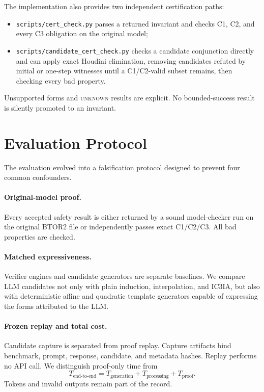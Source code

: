 \documentclass[10pt]{article}
\newcommand{\icthreeia}{\textsc{IC3IA}}
\newcommand{\btor}{\textsc{BTOR2}}
\newcommand{\code}[1]{\texttt{#1}}
\newcommand{\unknown}{\textsc{unknown}}
\begin{document}
The implementation also provides two independent certification paths:
\begin{itemize}
  \item \code{scripts/cert\_check.py} parses a returned invariant and checks
        C1, C2, and every C3 obligation on the original model;
  \item \code{scripts/candidate\_cert\_check.py} checks a candidate conjunction
        directly and can apply exact Houdini elimination, removing candidates
        refuted by initial or one-step witnesses until a C1/C2-valid subset
        remains, then checking every bad property.
\end{itemize}
Unsupported forms and \unknown{} results are explicit.  No bounded-success
result is silently promoted to an invariant.

\section{Evaluation Protocol}
\label{sec:protocol}

The evaluation evolved into a falsification protocol designed to prevent four
common confounders.

\paragraph{Original-model proof.}
Every accepted safety result is either returned by a sound model-checker run on
the original \btor{} file or independently passes exact C1/C2/C3.  All bad
properties are checked.

\paragraph{Matched expressiveness.}
Verifier engines and candidate generators are separate baselines.  We compare
LLM candidates not only with plain induction, interpolation, and \icthreeia{},
but also with deterministic affine and quadratic template generators capable
of expressing the forms attributed to the LLM.

\paragraph{Frozen replay and total cost.}
Candidate capture is separated from proof replay.  Capture artifacts bind
benchmark, prompt, response, candidate, and metadata hashes.  Replay performs
no API call.  We distinguish proof-only time from
\[
  T_{\mathrm{end\text{-}to\text{-}end}}
  =T_{\mathrm{generation}}+T_{\mathrm{processing}}+T_{\mathrm{proof}}.
\]
Tokens and invalid outputs remain part of the record.
\end{document}
